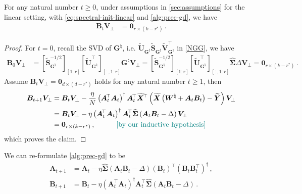 \begin{lemma}
\label{BV-perp}
    For any natural number $t \geq 0$, under assumptions in \cref{sec:assumptions} for the linear setting, with \eqref{eq:spectral-init-linear} and \eqref{alg:prec-gd}, we have
    \begin{align*}
        \bm B_t \bm V_\perp & = \bm 0_{r\times(k-r^*)}\,.
    \end{align*}
\end{lemma}
\begin{proof}
    For $t=0$, recall the SVD of $\mathbf{G}^\natural$, i.e. $\widetilde{\bm U}_{\bm G^\natural}\widetilde{\bm S}_{\bm G^\natural}\widetilde{\bm V}_{\bm G^\natural}^{\!\top}$ in \cref{NGG}, we have
    \begin{align*}
        \bm B_0 \bm V_\perp & = \left[\widetilde{\bm S}_{\bm G^\natural}^{-1/2}\right]_{[1:r]}\left[\widetilde{\bm U}_{\bm G^\natural}^{\!\top}\right]_{[:,1:r]}\mathbf{G}^{\natural} \bm V_\perp = \left[\widetilde{\bm S}_{\bm G^\natural}^{-1/2}\right]_{[1:r]}\left[\widetilde{\bm U}_{\bm G^\natural}^{\!\top}\right]_{[:,1:r]} \widehat{\bm \Sigma} \Delta \bm V_\perp = \bm 0_{r\times(k-r^*)}\,.
    \end{align*}
    Assume $\bm B_t \bm V_\perp= \bm 0_{d\times (d-r^*)}$ holds for any natural number $t\geq 1$, then
    \begin{align*}
        \bm B_{t+1} \bm V_\perp & = \bm B_t \bm V_\perp - \frac{\eta}{N}\left(\bm A_t^{\!\top} \bm A_t\right)^\dagger\bm A_t^{\!\top}\widetilde{\bm X}^{\!\top}\left(\widetilde{\bm X}\left(\bm W^\natural+\bm A_t \bm B_t\right)-\widetilde{\bm Y}\right)\bm V_\perp \\
        & = \bm B_t \bm V_\perp - \eta\left(\bm A_t^{\!\top} \bm A_t\right)^\dagger\bm A_t^{\!\top}\widehat{\bm \Sigma}\left(\bm A_t \bm B_t-\Delta\right)\bm V_\perp\\
        & = \bm 0_{r\times(k-r^*)}\,, \quad \tag*{\color{teal}[by our inductive hypothesis]}
    \end{align*}
    which proves the claim.
\end{proof}
We can re-formulate \eqref{alg:prec-gd} to be
\begin{align}
    \bm A_{t+1} & = \bm A_t - \eta\widehat{\bm \Sigma}\left(\bm A_t \bm B_t-\Delta\right)\left(\bm B_t\right)^{\!\top}\left(\bm B_t \bm B_t^{\!\top}\right)^\dagger\,,\label{reparam-linear-scaled-gd-A}\\
    \bm B_{t+1} & = \bm B_t - \eta\left(\bm A_t^{\!\top} \bm A_t\right)^\dagger\bm A_t^{\!\top}\widehat{\bm \Sigma}\left(\bm A_t \bm B_t-\Delta\right)\label{reparam-linear-scaled-gd-B}\,.
\end{align}
